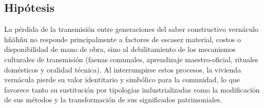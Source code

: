 \subsection{Hipótesis}




La pérdida de la transmisión entre generaciones del saber constructivo vernáculo hñähñu no responde principalmente a factores de escasez material, costos o disponibilidad de mano de obra, sino al debilitamiento de los mecanismos culturales de transmisión (faenas comunales, aprendizaje maestro-oficial, rituales domésticos y oralidad técnica). Al interrumpirse estos procesos, la vivienda vernácula pierde su valor identitario y simbólico para la comunidad, lo que favorece tanto su sustitución por tipologías industrializadas como la modificación de sus métodos y la transformación de sus significados patrimoniales.

